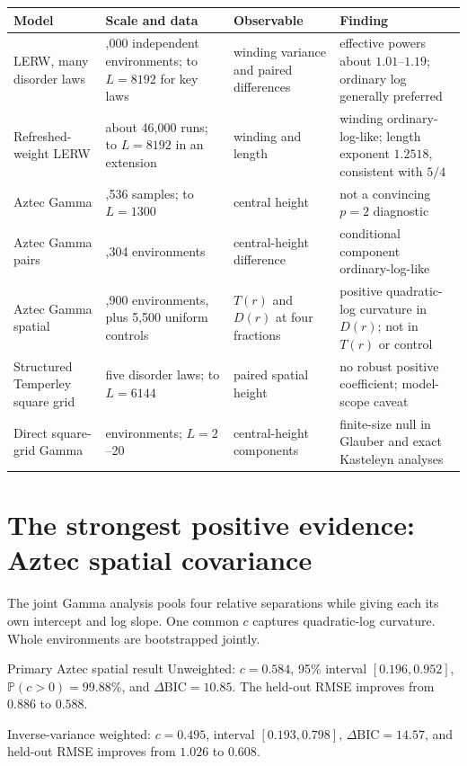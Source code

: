 \documentclass[11pt,a4paper,oneside,openany]{memoir}
\newcommand{\Prob}{\mathbb{P}}
\newcommand{\1}{\bm{1}}
\begin{document}
\small
\begin{tabularx}{\textwidth}{>{\raggedright\arraybackslash}p{} >{\raggedright\arraybackslash}p{} >{\raggedright\arraybackslash}p{} X}
\toprule
\textbf{Model} & \textbf{Scale and data} & \textbf{Observable} & \textbf{Finding}\\
\midrule
LERW, many disorder laws & 379,000 independent environments; to $L=8192$ for key laws & winding variance and paired differences & effective powers about $1.01$--$1.19$; ordinary log generally preferred\\
Refreshed-weight LERW & about 46,000 runs; to $L=8192$ in an extension & winding and length & winding ordinary-log-like; length exponent $1.2518$, consistent with $5/4$\\
Aztec Gamma & 35,536 samples; to $L=1300$ & central height & not a convincing $p=2$ diagnostic\\
Aztec Gamma pairs & 28,304 environments & central-height difference & conditional component ordinary-log-like\\
Aztec Gamma spatial & 6,900 environments, plus 5,500 uniform controls & $T(r)$ and $D(r)$ at four fractions & positive quadratic-log curvature in $D(r)$; not in $T(r)$ or control\\
Structured Temperley square grid & five disorder laws; to $L=6144$ & paired spatial height & no robust positive coefficient; model-scope caveat\\
Direct square-grid Gamma & 960 environments; $L=2$--20 & central-height components & finite-size null in Glauber and exact Kasteleyn analyses\\
\bottomrule
\end{tabularx}
\normalsize

\section{The strongest positive evidence: Aztec spatial covariance}

The joint Gamma analysis pools four relative separations while giving each its
own intercept and log slope. One common $c$ captures quadratic-log curvature.
Whole environments are bootstrapped jointly.

\begin{resultbox}{Primary Aztec spatial result}
Unweighted: $c=0.584$, 95\% interval $[0.196,0.952]$,
$\Prob(c>0)=99.88\%$, and $\Delta\mathrm{BIC}=10.85$.
The held-out RMSE improves from $0.886$ to $0.588$.

Inverse-variance weighted: $c=0.495$, interval $[0.193,0.798]$,
$\Delta\mathrm{BIC}=14.57$, and held-out RMSE improves from $1.026$ to $0.608$.
\end{resultbox}
\end{document}
